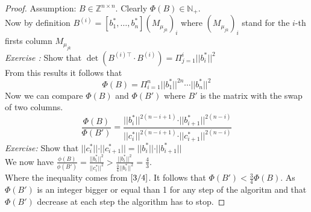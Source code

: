 \documentclass[a4paper,11pt,american]{article}
\newcommand{\N}{\mathbb{N}}
\newcommand{\Z}{\mathbb{Z}}
\newcommand{\norm}[1]{\vert\vert#1\vert\vert}
\theoremstyle{plain}
\theoremstyle{definition}
\begin{document}
\begin{proof}
    Assumption: $B\in\Z^{n\times n}$. Clearly $\Phi(B)\in\N_+$.\\
    Now by definition $B^{(i)}=[b_1^*,\dots,b_n^*](M_{\mu_{jk}})_i$ where $(M_{\mu_{jk}})_i$ stand for the $i$-th firsts column $M_{\mu_{jk}}$\\
    \emph{Exercise :} Show that $\det(B^{(i)\top}\cdot B^{(i)})=\Pi^i_{j=1}\norm{b_i^*}^2$\\
    From this results it follows that $$\Phi(B)=\Pi_{i=1}^n\norm{b_1^*}^{2n}\cdots\norm{b_n^*}^2$$
    Now we can compare $\Phi(B)$ and $\Phi(B')$ where $B'$ is the matrix with the swap of two columns.
    $$\frac{\Phi(B)}{\Phi(B')}=\frac{\norm{b_i^*}^{2(n-i+1)}\cdot\norm{b_{i+1}^*}^{2(n-i)}}{\norm{c_i^*}^{2(n-i+1)}\cdot\norm{c_{i+1}^*}^{2(n-i)}}$$
    \emph{Exercise:} Show that $\norm{c_i^*}\cdot\norm{c_{i+1}^*}=\norm{b_i^*}\cdot\norm{b_{i+1}^*}$\\
    We now have $\frac{\phi(B)}{\phi(B')}=\frac{\norm{b_i^*}^2}{\norm{c_i^*}^2}>\frac{\norm{b_i^*}^2}{\frac{3}{4}\norm{b_i^*}^2}=\frac{4}{3}$.\\
    Where the inequality comes from $\eqref{3/4}$.
    It follows that $\Phi(B')<\frac{3}{4}\Phi(B)$. As $\Phi(B')$ is an integer bigger or equal than 1 for any step of the algoritm and that $\Phi(B')$ decrease at each step the algorithm has to stop. 
\end{proof}
\end{document}
